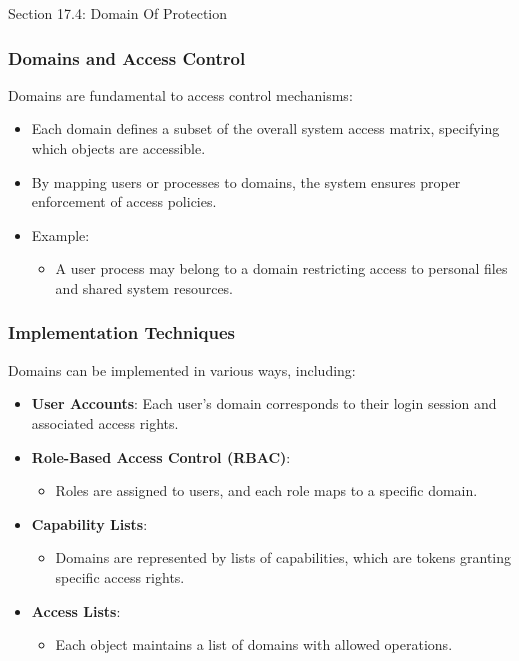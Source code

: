 \begin{notes}{Section 17.4: Domain Of Protection}
    \subsubsection*{Domains and Access Control}
    
    Domains are fundamental to access control mechanisms:
    \begin{itemize}
        \item Each domain defines a subset of the overall system access matrix, specifying which objects are accessible.
        \item By mapping users or processes to domains, the system ensures proper enforcement of access policies.
        \item Example:
        \begin{itemize}
            \item A user process may belong to a domain restricting access to personal files and shared system resources.
        \end{itemize}
    \end{itemize}
    
    \subsubsection*{Implementation Techniques}
    
    Domains can be implemented in various ways, including:
    \begin{itemize}
        \item \textbf{User Accounts}: Each user's domain corresponds to their login session and associated access rights.
        \item \textbf{Role-Based Access Control (RBAC)}:
        \begin{itemize}
            \item Roles are assigned to users, and each role maps to a specific domain.
        \end{itemize}
        \item \textbf{Capability Lists}:
        \begin{itemize}
            \item Domains are represented by lists of capabilities, which are tokens granting specific access rights.
        \end{itemize}
        \item \textbf{Access Lists}:
        \begin{itemize}
            \item Each object maintains a list of domains with allowed operations.
        \end{itemize}
    \end{itemize}
    

\end{notes}
